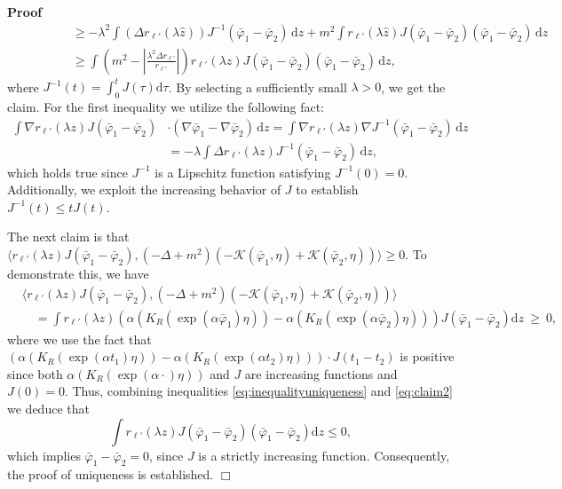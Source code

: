 \documentclass{article}
\newcommand{\mathd}{\mathrm{d}}
\newenvironment{proof}{\noindent\textbf{Proof\ }}{\hspace*{\fill}$\Box$\medskip}
\begin{document}
\begin{proof}
\begin{align*}
       & \qquad \qquad \geqslant - \lambda^2  \int (\Delta r_{\ell'} (\lambda
       \hat{z})) J^{- 1} (\bar{\varphi}_1 - \bar{\varphi}_2) \, \mathd z + m^2 
       \int r_{\ell'}  (\lambda \hat{z}) J (\bar{\varphi}_1 - \bar{\varphi}_2)
       (\bar{\varphi}_1 - \bar{\varphi}_2) \, \mathd z\\
       & \qquad \qquad \geqslant \int \left( m^2 - \left| \frac{\lambda^2 \Delta
       r_{\ell'}}{r_{\ell'}} \right| \right) r_{\ell'} (\lambda z) J
       (\bar{\varphi}_1 - \bar{\varphi}_2) (\bar{\varphi}_1 - \bar{\varphi}_2)     \, \mathd z,     
    \end{align*}
  where $J^{- 1} (t) = \int_0^t J (\tau) \mathd \tau$. By selecting a sufficiently small $\lambda > 0$, we get the claim. For the first inequality we utilize  the
  following fact: 
  \begin{align*}
    \int \nabla r_{\ell'} (\lambda z) J (\bar{\varphi}_1 - \bar{\varphi}_2) & 
       \cdot (\nabla \bar{\varphi}_1 - \nabla \bar{\varphi}_2) \, \mathd z = \int
       \nabla r_{\ell'} (\lambda z) \nabla J^{- 1} (\bar{\varphi}_1 -
       \bar{\varphi}_2) \, \mathd z \\
       & = - \lambda \int \Delta r_{\ell'} (\lambda z) J^{- 1} (\bar{\varphi}_1
       - \bar{\varphi}_2) \, \mathd z,   
  \end{align*}
  which holds true since $J^{- 1}$ is a Lipschitz function satisfying $J^{- 1} (0)= 0$. Additionally, we exploit the increasing behavior of $J$ to establish 
  $J^{- 1} (t) \leqslant t J (t) $.
  
  The next claim is that $\langle r_{\ell'} (\lambda z) J
  (\bar{\varphi}_1 - \bar{\varphi}_2), (- \Delta + m^2)
  (-\mathcal{K}(\bar{\varphi}_1, \eta) +\mathcal{K}(\bar{\varphi}_2, \eta))
  \rangle \geqslant 0$. To demonstrate this, we have 
  \begin{align}
      & \langle r_{\ell'} (\lambda z) J (\bar{\varphi}_1 - \bar{\varphi}_2), (-
      \Delta + m^2) (-\mathcal{K}(\bar{\varphi}_1, \eta)
      +\mathcal{K}(\bar{\varphi}_2, \eta)) \rangle \\
      & \quad = \int r_{\ell'} (\lambda z) (\alpha (K_R (\exp (\alpha \bar{\varphi}_1)
      \eta)) - \alpha (K_R (\exp (\alpha \bar{\varphi}_2) \eta))) J
      (\bar{\varphi}_1 - \bar{\varphi}_2) \mathd z ~\geqslant~ 0,
     \label{eq:claim2}
  \end{align}
  where we use the fact that $(\alpha (K_R (\exp (\alpha t_1) \eta)) - \alpha (K_R
  (\exp (\alpha t_2) \eta))) \cdot J (t_1 - t_2)$ is positive since both  $\alpha (K_R (\exp (\alpha \cdot) \eta))$ and $J$ are increasing functions   and $J (0) = 0$. 
  Thus, combining inequalities \eqref{eq:inequalityuniqueness} and
  \eqref{eq:claim2} we deduce that
  \[ \int r_{\ell'} (\lambda z) J (\bar{\varphi}_1 - \bar{\varphi}_2)
     (\bar{\varphi}_1 - \bar{\varphi}_2) \mathd z \leqslant 0, \]
  which implies $\bar{\varphi}_1 - \bar{\varphi}_2 = 0$, since $J$ is a strictly increasing function. Consequently, the proof of uniqueness is established.
\end{proof}
\end{document}
